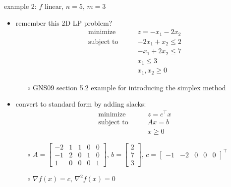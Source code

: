 \documentclass[10pt,hyperref,dvipsnames]{beamer}
\newcommand{\grad}{\nabla}
\newcommand{\ds}{\displaystyle}
\begin{document}
\begin{frame}{example 2: $f$ linear, $n=5$, $m=3$}

\begin{itemize}
\item remember this 2D LP problem?
\begin{equation*}
\begin{matrix}
\text{minimize} \qquad & z = -x_1 - 2x_2 \\
\text{subject to} \qquad & -2x_1 + x_2 \le 2 \\
 & -x_1 + 2x_2 \le 7 \\
 & x_1 \le 3 \\
 & x_1, x_2 \ge 0
\end{matrix}
\end{equation*}

    \begin{itemize}
    \item[$\circ$] GNS09 section 5.2  example for introducing the simplex method
    \end{itemize}

\medskip
\item convert to standard form by adding slacks:
\begin{equation*}
\begin{matrix}
\text{minimize} \qquad & z = c^\top x \\
\text{subject to} \qquad & A x = b \\
 & x \ge 0
\end{matrix}
\end{equation*}

    \begin{itemize}
    \item[$\circ$] $\ds A = \begin{bmatrix} -2 & 1 & 1 & 0 & 0 \\ -1 & 2 & 0 & 1 & 0 \\ 1 & 0 & 0 & 0 & 1 \end{bmatrix}$, $\ds b = \begin{bmatrix} 2 \\ 7 \\ 3 \end{bmatrix}$, $c = \begin{bmatrix} -1 & -2 & 0 & 0 & 0 \end{bmatrix}^\top$
    \item[$\circ$] $\grad f(x) = c$, \quad $\grad^2 f(x)=0$
    \end{itemize}
\end{itemize}
\end{frame}
\end{document}

